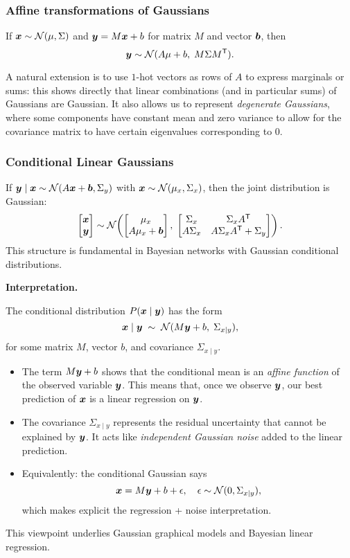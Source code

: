 \documentclass[11pt]{article}
\begin{document}
\subsubsection{Affine transformations of Gaussians}
If $\bm{x} \sim \mathcal{N}(\mu, \Sigma)$ and $\bm{y} = M\bm{x} + b$ for matrix $M$ and vector $\bm{b}$, then
\[
\bm{y} \sim \mathcal{N}(A\mu + b, \; M\Sigma M^{\mathsf{T}}).
\]

A natural extension is to use $1$-hot vectors as rows of $A$ to express marginals or sums: this shows directly that linear combinations (and in particular sums) of Gaussians are Gaussian. It also allows us to represent \emph{degenerate Gaussians}, where some components have constant mean and zero variance to allow for the covariance matrix to have certain eigenvalues corresponding to 0. 

\subsubsection{Conditional Linear Gaussians}
If $\bm{y} \mid \bm{x} \sim \mathcal{N}(A\bm{x} + \bm{b}, \Sigma_y)$ with $\bm{x} \sim \mathcal{N}(\mu_x, \Sigma_x)$, then the joint distribution is Gaussian:
\[
\begin{bmatrix}\bm{x} \\ \bm{y}\end{bmatrix}
\sim \mathcal{N}\!\left(
\begin{bmatrix}\mu_x \\ A\mu_x + \bm{b}\end{bmatrix}, \;
\begin{bmatrix}
\Sigma_x & \Sigma_x A^{\mathsf{T}} \\
A\Sigma_x & A\Sigma_x A^{\mathsf{T}} + \Sigma_y
\end{bmatrix}
\right).
\]
This structure is fundamental in Bayesian networks with Gaussian conditional distributions.

\begin{note}
\textbf{Interpretation.}  

The conditional distribution $P(\bm{x} \mid \bm{y})$ has the form
\[
\bm{x} \mid \bm{y} \;\sim\; \mathcal{N}(M\bm{y} + b, \;\Sigma_{x \mid y}),
\]
for some matrix $M$, vector $b$, and covariance $\Sigma_{x \mid y}$.

\begin{itemize}
    \item The term $M\bm{y} + b$ shows that the conditional mean is an \emph{affine function} of the observed variable $\bm{y}$.  
    This means that, once we observe $\bm{y}$, our best prediction of $\bm{x}$ is a linear regression on $\bm{y}$.

    \item The covariance $\Sigma_{x \mid y}$ represents the residual uncertainty that cannot be explained by $\bm{y}$.  
    It acts like \emph{independent Gaussian noise} added to the linear prediction.  

    \item Equivalently: the conditional Gaussian says \[
    \bm{x} = M\bm{y} + b + \epsilon, \quad \epsilon \sim \mathcal{N}(0, \Sigma_{x \mid y}),
    \]
    which makes explicit the regression + noise interpretation.
\end{itemize}
This viewpoint underlies Gaussian graphical models and Bayesian linear regression.
\end{note}
\end{document}
